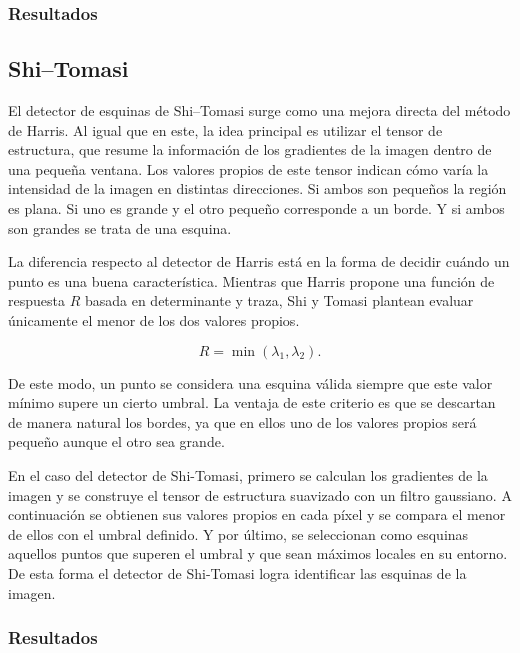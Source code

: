 \subsubsection{Resultados}


\subsection{Shi–Tomasi}

El detector de esquinas de Shi--Tomasi \cite{shi1994good} surge como una mejora directa del método de Harris. Al igual que en este, la idea principal es utilizar el tensor de estructura, que resume la información de los gradientes de la imagen dentro de una pequeña ventana. Los valores propios de este tensor indican cómo varía la intensidad de la imagen en distintas direcciones. Si ambos son pequeños la región es plana. Si uno es grande y el otro pequeño corresponde a un borde. Y si ambos son grandes se trata de una esquina.

La diferencia respecto al detector de Harris está en la forma de decidir cuándo un punto es una buena característica. Mientras que Harris propone una función de respuesta \(R\) basada en determinante y traza, Shi y Tomasi plantean evaluar únicamente el menor de los dos valores propios.

\[
R = \min(\lambda_1, \lambda_2).
\]

De este modo, un punto se considera una esquina válida siempre que este valor mínimo supere un cierto umbral. La ventaja de este criterio es que se descartan de manera natural los bordes, ya que en ellos uno de los valores propios será pequeño aunque el otro sea grande.

En el caso del detector de Shi-Tomasi, primero se calculan los gradientes de la imagen y se construye el tensor de estructura suavizado con un filtro gaussiano. A continuación se obtienen sus valores propios en cada píxel y se compara el menor de ellos con el umbral definido. Y por último, se seleccionan como esquinas aquellos puntos que superen el umbral y que sean máximos locales en su entorno. De esta forma el detector de Shi-Tomasi logra identificar las esquinas de la imagen.


\subsubsection{Resultados}

